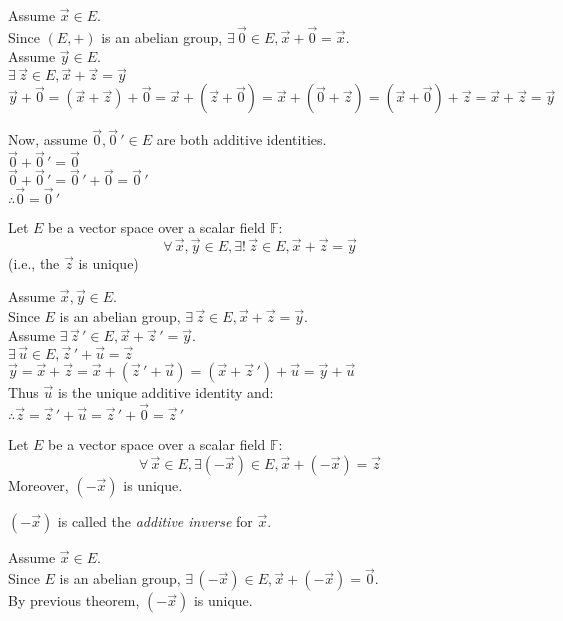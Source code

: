 \documentclass[letterpaper,12pt,fleqn]{article}
\newcommand{\F}{\mathbb{F}}
\newcommand{\vx}{\vec{x}}
\newcommand{\vy}{\vec{y}}
\newcommand{\vz}{\vec{z}}
\newcommand{\vu}{\vec{u}}
\newcommand{\vo}{\vec{0}}
\begin{document}
\begin{theproof}
  Assume $\vx\in E$. \\
  Since $(E,+)$ is an abelian group, $\exists\,\vo\in E,\vx+\vo=\vx$. \\
  Assume $\vy\in E$. \\
  $\exists\,\vz\in E,\vx+\vz=\vy$ \\
  $\vy+\vo=(\vx+\vz)+\vo=\vx+(\vz+\vo)=\vx+(\vo+\vz)=(\vx+\vo)+\vz=
  \vx+\vz=\vy$

  Now, assume $\vo,\vo\,'\in E$ are both additive identities. \\
  $\vo+\vo\,'=\vo$ \\
  $\vo+\vo\,'=\vo\,'+\vo=\vo\,'$ \\
  $\therefore\vo=\vo\,'$
\end{theproof}

\begin{theorem}
  Let $E$ be a vector space over a scalar field $\F$:
  \[\forall\,\vx,\vy\in E,\exists!\,\vz\in E,\vx+\vz=\vy\]
  (i.e., the $\vz$ is unique)
\end{theorem}

\begin{theproof}
  Assume $\vx,\vy\in E$. \\
  Since $E$ is an abelian group, $\exists\,\vz\in E, \vx+\vz=\vy$. \\
  Assume $\exists\,\vz\,'\in E, \vx+\vz\,'=\vy$. \\
  $\exists\,\vu\in E,\vz\,'+\vu=\vz$ \\
  $\vy=\vx+\vz=\vx+(\vz\,'+\vu)=(\vx+\vz\,')+\vu=\vy+\vu$ \\
  Thus $\vu$ is the unique additive identity and: \\
  $\therefore\vz=\vz\,'+\vu=\vz\,'+\vo=\vz\,'$
\end{theproof}

\begin{theorem}
  Let $E$ be a vector space over a scalar field $\F$: \\
  \[\forall\,\vx\in E,\exists(-\vx)\in E,\vx+(-\vx)=\vz\]
  Moreover, $(-\vx)$ is unique.

  $(-\vx)$ is called the \emph{additive inverse} for $\vx$.
\end{theorem}

\begin{theproof}
  Assume $\vx\in E$. \\
  Since $E$ is an abelian group, $\exists\,(-\vx)\in E,\vx+(-\vx)=\vo$. \\
  By previous theorem, $(-\vx)$ is unique.
\end{theproof}
\end{document}
